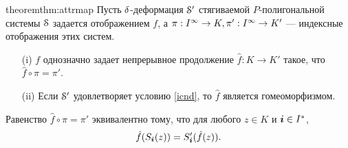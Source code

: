 \begin{restatethis}{theorem}{thm:attrmap}\label{thm:attrmap}
Пусть  $\delta$-деформация ${\EuScript S}'$ стягиваемой $P$-полигональной системы ${\EuScript S}$ задается отображением $f$, а $\pi:I^\infty\to K, \pi':I^\infty\to K'$ --- индексные отображения этих систем.
\begin{itemize}[nolistsep]
    \item[(i)] $f$ однозначно задает непрерывное продолжение $\hat f:K\to K'$ такое, что $\hat f\circ\pi=\pi'$.
    \item[(ii)] Если ${\EuScript S}'$ удовлетворяет условию \eqref{icnd}, то $\hat f$ является гомеоморфизмом.
\end{itemize}    
\end{restatethis}

\begin{remark}
Равенство  $\hat f\circ\pi=\pi'$ эквивалентно тому, что для любого $z\in K$ и ${\bm{i}}\in I^*$,
\begin{equation}\label{compat}
\hat f(S_{\bm{i}}(z))=S'_{\bm{i}}(\hat f(z)).
\end{equation}
\end{remark}

